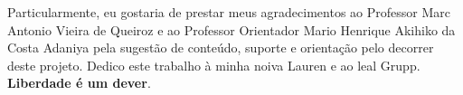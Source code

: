 \documentclass[article,12pt,oneside,a4paper,english,brazil]{unifil}
\begin{document}
\begin{Spacing}{1.5}
Particularmente, eu gostaria de prestar meus agradecimentos ao Professor Marc Antonio Vieira de Queiroz e ao Professor Orientador Mario Henrique Akihiko da Costa Adaniya pela sugestão de conteúdo, suporte e orientação pelo decorrer deste projeto. Dedico este trabalho à minha noiva Lauren e ao leal Grupp.\\ \textbf{Liberdade é um dever}.



\end{Spacing}
\postextual


\end{document}
